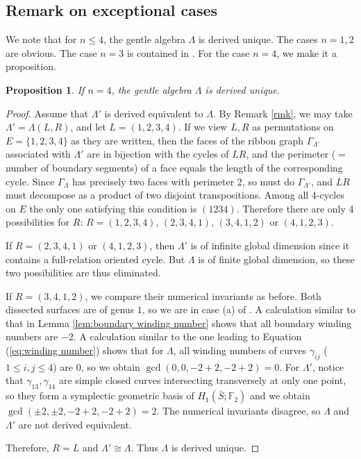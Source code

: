 \documentclass[11pt,reqno]{amsart}
\theoremstyle{plain}
\newtheorem{proposition}[theorem]{Proposition}
\theoremstyle{definition}
\theoremstyle{remark}
\numberwithin{equation}{section}
\begin{document}
\subsection{Remark on exceptional cases}
\par We note that for $n\leq4$, the gentle algebra $\Lambda$ is derived unique. The cases $n=1,2$ are obvious. The case $n=3$ is contained in \cite[Theorem A]{Bob}. For the case $n=4$, we make it a proposition.
\begin{proposition}
    If $n=4$, the gentle algebra $\Lambda$ is derived unique.
\end{proposition}
\begin{proof}
    Assume that $\Lambda'$ is derived equivalent to $\Lambda$. By Remark \ref{rmk}, we may take $\Lambda'=\Lambda(L,R)$, and let $L=(1,2,3,4)$. If we view $L,R$ as permutations on $E=\{1,2,3,4\}$ as they are written, then the faces of the ribbon graph $\Gamma_{\Lambda'}$ associated with $\Lambda'$ are in bijection with the cycles of $LR$, and the perimeter ($=$ number of boundary segments) of a face equals the length of the corresponding cycle. Since $\Gamma_\Lambda$ has precisely two faces with perimeter 2, so must do $\Gamma_{\Lambda'}$, and $LR$ must decompose as a product of two disjoint transpositions. Among all 4-cycles on $E$ the only one satisfying this condition is $(1234)$. Therefore there are only 4 possibilities for $R$: $R=(1,2,3,4)$, $(2,3,4,1)$, $(3,4,1,2)$ or $(4,1,2,3)$. 
    \par If $R=(2,3,4,1)$ or $(4,1,2,3)$, then $\Lambda'$ is of infinite global dimension since it contains a full-relation oriented cycle. But $\Lambda$ is of finite global dimension, so these two possibilities are thus eliminated.
    \par If $R=(3,4,1,2)$, we compare their numerical invariants as before. Both dissected surfaces are of genus $1$, so we are in case (a) of \cite[Theorem 7.4(3)]{APS}. A calculation similar to that in Lemma \ref{lem:boundary winding number} shows that all boundary winding numbers are $-2$. A calculation similar to the one leading to Equation (\ref{eq:winding number}) shows that for $\Lambda$, all winding numbers of curves $\gamma_{ij}$ ($1\leq i,j\leq 4$) are 0, so we obtain $\gcd(0,0,-2+2,-2+2)=0$. For $\Lambda'$, notice that $\gamma_{13},\gamma_{14}$ are simple closed curves intersecting transversely at only one point, so they form a symplectic geometric basis of $H_1(\bar S;\mathbb{F}_2)$ and we obtain $\gcd(\pm2,\pm2,-2+2,-2+2)=2$. The numerical invariants disagree, so $\Lambda$ and $\Lambda'$ are not derived equivalent.
    \par Therefore, $R=L$ and $\Lambda'\cong\Lambda$. Thus $\Lambda$ is derived unique.
\end{proof}
\end{document}

